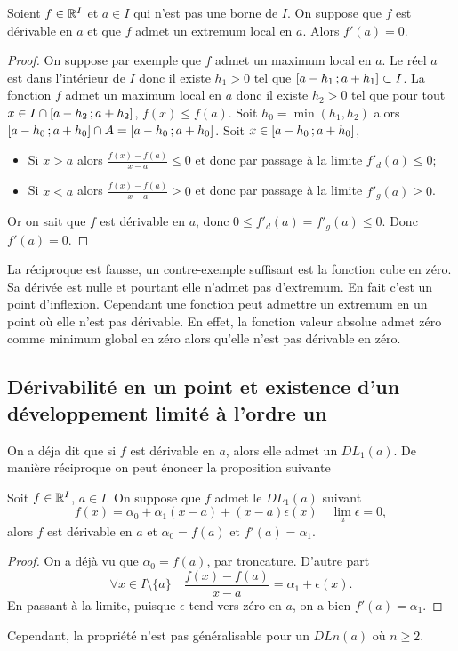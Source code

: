 \begin{theo}
  Soient \(f \in \mathbb{R}^I\) et \(a \in I\) qui n'est pas une borne de \(I\). On suppose que \(f\) est dérivable en \(a\) et que \(f\) admet un extremum local en \(a\). Alors \(f'(a)=0\).
\end{theo}
\begin{proof}
  On suppose par exemple que \(f\) admet un maximum local en \(a\). Le réel \(a\) est dans l'intérieur de \(I\) donc il existe \(h_1>0\) tel que \(\left[ a-h_1 \, ;  a+h_1 \right] \subset I\). La fonction \(f\) admet un maximum local en \(a\) donc il existe \(h_2>0\) tel que pour tout \(x \in I \cap \left[ a-h_2 \, ;  a+h_2 \right]\), \(f(x) \leqslant f(a)\). Soit \(h_0=\min(h_1,h_2)\) alors \(\left[ a-h_0 \, ;  a+h_0 \right] \cap A = \left[ a-h_0 \, ;  a+h_0 \right]\). Soit \(x \in \left[ a-h_0 \, ;  a+h_0 \right]\),
  \begin{itemize}
  \item Si \(x > a\) alors \(\frac{f(x)-f(a)}{x-a} \leqslant 0\) et donc par passage à la limite \(f'_d(a) \leqslant 0\);
  \item Si \(x < a\) alors \(\frac{f(x)-f(a)}{x-a} \geqslant 0\) et donc par passage à la limite \(f'_g(a) \geqslant 0\).
  \end{itemize}
  Or on sait que \(f\) est dérivable en \(a\), donc \(0 \leqslant f'_d(a)=f'_g(a) \leqslant 0\). Donc \(f'(a)=0\).
\end{proof}

La réciproque est fausse, un contre-exemple suffisant est la fonction cube en zéro. Sa dérivée est nulle et pourtant elle n'admet pas d'extremum. En fait c'est un point d'inflexion. Cependant une fonction peut admettre un extremum en un point où elle n'est pas dérivable. En effet, la fonction valeur absolue admet zéro comme minimum global en zéro alors qu'elle n'est pas dérivable en zéro.

\subsection{Dérivabilité en un point et existence d'un développement limité à l'ordre un}
On a déja dit que si \(f\) est dérivable en \(a\), alors elle admet un \(DL_1(a)\). De manière réciproque on peut énoncer la proposition suivante
\begin{prop}
  Soit \(f \in \mathbb{R}^I\), \(a \in I\). On suppose que \(f\) admet le \(DL_1(a)\) suivant
  \begin{equation}
    f(x)=\alpha_0 +\alpha_1(x-a) +(x-a) \epsilon(x) \quad \lim_a \epsilon =0,
  \end{equation}
  alors \(f\) est dérivable en \(a\) et \(\alpha_0=f(a)\) et \(f'(a)=\alpha_1\).
\end{prop}
\begin{proof}
  On a déjà vu que \(\alpha_0=f(a)\), par troncature. D'autre part
  \begin{equation}
    \forall x \in I\setminus\{a\} \quad \frac{f(x)-f(a)}{x-a} = \alpha_1 +\epsilon(x).
  \end{equation}
  En passant à la limite, puisque \(\epsilon\) tend vers zéro en \(a\), on a bien \(f'(a)=\alpha_1\).
\end{proof}
Cependant, la propriété n'est pas généralisable pour un \(DLn(a)\) où \(n \geqslant 2\).

